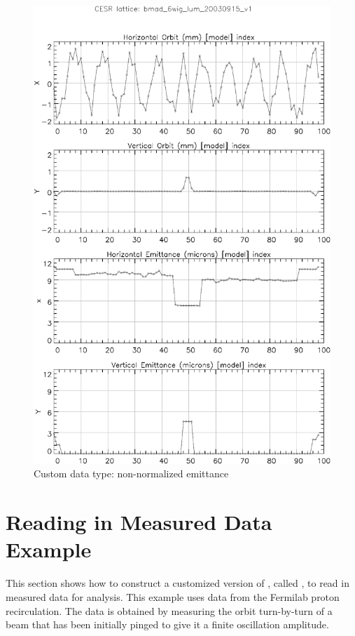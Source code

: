 {{{{\begin{figure}
  \centering
  \includegraphics[width=5in]{plot-emittance.pdf}
  \caption{Custom data type: non-normalized emittance}
  \label{f:plot.emittance}
\end{figure}

\section{Reading in Measured Data Example}
\label{s:cust.read.example}

This section shows how to construct a customized version of \tao, called , to
read in measured data for analysis. This example uses data from the Fermilab proton
recirculation. The data is obtained by measuring the orbit turn-by-turn of a beam that has been
initially pinged to give it a finite oscillation amplitude.

}}}}

